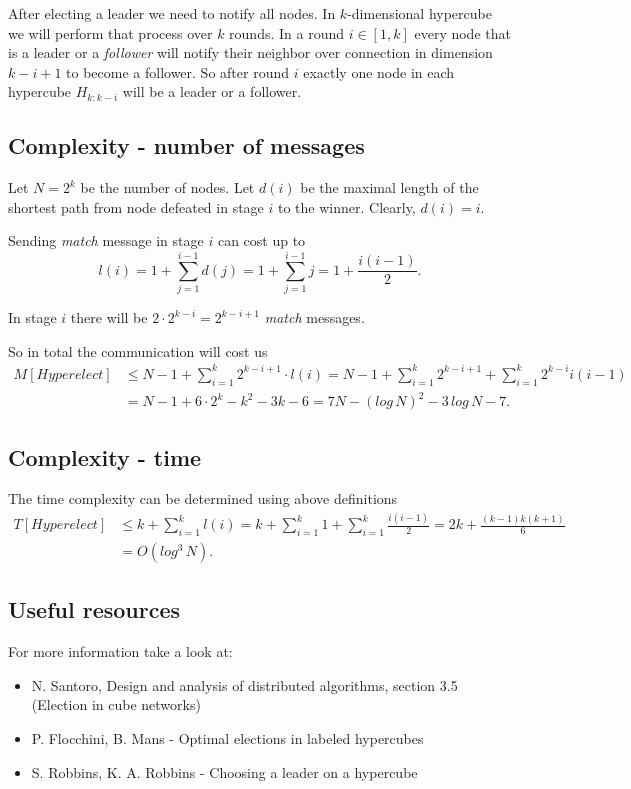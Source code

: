 \documentclass[11pt]{article}
\begin{document}
After electing a leader we need to notify all nodes. In $k$-dimensional hypercube we will perform that process over $k$ rounds. In a round $i\in[1, k]$ every node that is a leader or a \textit{follower} will notify their neighbor over connection in dimension $k-i+1$ to become a follower. So after round $i$ exactly one node in each hypercube $H_{k:k-i}$ will be a leader or a follower.

\subsection*{Complexity - number of messages}

Let $N = 2^{k}$ be the number of nodes. Let $d(i)$ be the maximal length of the shortest path from node defeated in stage $i$ to the winner. Clearly, $d(i) = i$.

Sending \textit{match} message in stage $i$ can cost up to 
$$l(i) = 1 + \sum_{j=1}^{i-1}d(j) = 1 + \sum_{j=1}^{i-1}j = 1 + \frac{i(i-1)}{2}.$$

In stage $i$ there will be $2\cdot 2^{k-i} = 2^{k-i+1}$ \textit{match} messages.

So in total the communication will cost us
\begin{align*}
    M[Hyperelect] &\leq N-1 + \sum_{i=1}^{k}2^{k-i+1}\cdot l(i) 
    = N-1 + \sum_{i=1}^{k}2^{k-i+1} + \sum_{i=1}^{k}2^{k-i}i(i-1)\\
    &= N-1 + 6\cdot 2^{k}-k^{2}-3k-6 = 7N - (log\,N)^{2} - 3\,log\,N-7.
\end{align*}

\subsection*{Complexity - time}

The time complexity can be determined using above definitions
\begin{align*}
    T[Hyperelect] &\leq k + \sum_{i=1}^{k}l(i) 
    = k + \sum_{i=1}^{k}1+\sum_{i=1}^{k}\frac{i(i-1)}{2} 
    = 2k + \frac{(k-1)k(k+1)}{6} \\
    &= O(log^{3}\,N).
\end{align*}

\subsection*{Useful resources}
For more information take a look at:
\begin{itemize}
    \item N. Santoro, Design and analysis of distributed algorithms, section 3.5 (Election in cube networks)
    \item P. Flocchini, B. Mans - Optimal elections in labeled hypercubes
    \item S. Robbins, K. A. Robbins - Choosing a leader on a hypercube
\end{itemize}
\end{document}
